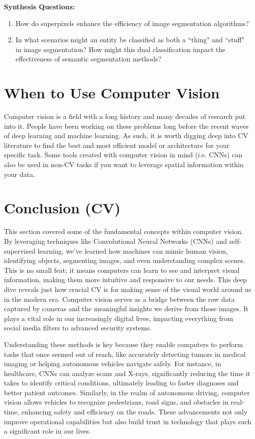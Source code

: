 \vspace{10bp}
\begin{questionbox}
    \textbf{Synthesis Questions:}
    \begin{enumerate}    
        \item How do superpixels enhance the efficiency of image segmentation algorithms?
        \item In what scenarios might an entity be classified as both a ``thing" and ``stuff" in image segmentation? How might this dual classification impact the effectiveness of semantic segmentation methods?
    \end{enumerate}
    \vspace{1bp}
\end{questionbox}

\section{When to Use Computer Vision}
    \large Computer vision is a field with a long history and many decades of research put into it. People have been working on these problems long before the recent waves of deep learning and machine learning. As such, it is worth digging deep into CV literature to find the best and most efficient model or architecture for your specific task. Some tools created with computer vision in mind (i.e. CNNs) can also be used in non-CV tasks if you want to leverage spatial information within your data.

\section{Conclusion (CV)}
    \large 
    This section covered some of the fundamental concepts within computer vision. By leveraging techniques like Convolutional Neural Networks (CNNs) and self-supervised learning, we’ve learned how machines can mimic human vision, identifying objects, segmenting images, and even understanding complex scenes. This is no small feat; it means computers can learn to see and interpret visual information, making them more intuitive and responsive to our needs. This deep dive reveals just how crucial CV is for making sense of the visual world around us in the modern era. Computer vision serves as a bridge between the raw data captured by cameras and the meaningful insights we derive from those images. It plays a vital role in our increasingly digital lives, impacting everything from social media filters to advanced security systems.  
    
    Understanding these methods is key because they enable computers to perform tasks that once seemed out of reach, like accurately detecting tumors in medical imaging or helping autonomous vehicles navigate safely. For instance, in healthcare, CNNs can analyze scans and X-rays, significantly reducing the time it takes to identify critical conditions, ultimately leading to faster diagnoses and better patient outcomes. Similarly, in the realm of autonomous driving, computer vision allows vehicles to recognize pedestrians, road signs, and obstacles in real-time, enhancing safety and efficiency on the roads. These advancements not only improve operational capabilities but also build trust in technology that plays such a significant role in our lives.
